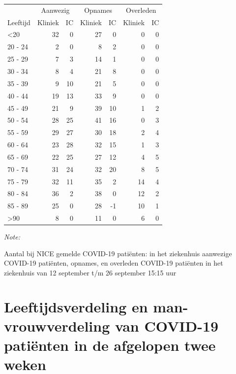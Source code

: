 \documentclass[
  english,
  man,floatsintext]{apa6}
\begin{document}
\begin{table}
\centering\begingroup\fontsize{10}{12}\selectfont

\begin{threeparttable}
\begin{tabular}{lrrrrrr}
\toprule
\multicolumn{1}{c}{ } & \multicolumn{2}{c}{Aanwezig} & \multicolumn{2}{c}{Opnames} & \multicolumn{2}{c}{Overleden} \\
\cmidrule(l{3pt}r{3pt}){2-3} \cmidrule(l{3pt}r{3pt}){4-5} \cmidrule(l{3pt}r{3pt}){6-7}
Leeftijd & Kliniek & IC & Kliniek & IC & Kliniek & IC\\
\midrule
<20 & 32 & 0 & 27 & 0 & 0 & 0\\
20 - 24 & 2 & 0 & 8 & 2 & 0 & 0\\
25 - 29 & 7 & 3 & 14 & 1 & 0 & 0\\
30 - 34 & 8 & 4 & 21 & 8 & 0 & 0\\
35 - 39 & 9 & 10 & 21 & 5 & 0 & 0\\
40 - 44 & 19 & 13 & 33 & 9 & 0 & 0\\
45 - 49 & 21 & 9 & 39 & 10 & 1 & 2\\
50 - 54 & 28 & 25 & 41 & 16 & 0 & 3\\
55 - 59 & 29 & 27 & 30 & 18 & 2 & 4\\
60 - 64 & 23 & 28 & 32 & 15 & 1 & 3\\
65 - 69 & 22 & 25 & 27 & 12 & 4 & 5\\
70 - 74 & 31 & 24 & 32 & 20 & 8 & 5\\
75 - 79 & 32 & 11 & 35 & 2 & 14 & 4\\
80 - 84 & 36 & 2 & 38 & 0 & 12 & 2\\
85 - 89 & 25 & 0 & 28 & -1 & 10 & 1\\
>90 & 8 & 0 & 11 & 0 & 6 & 0\\
\bottomrule
\end{tabular}
\begin{tablenotes}
\item \textit{Note: } 
\item Aantal bij NICE gemelde COVID-19 patiënten: in het ziekenhuis aanwezige COVID-19 patiënten, opnames, en overleden COVID-19 patiënten in het ziekenhuis van 12 september t/m 26 september 15:15 uur
\end{tablenotes}
\end{threeparttable}
\endgroup{}
\end{table}

\newpage

\hypertarget{leeftijdsverdeling-en-man-vrouwverdeling-van-covid-19-patiuxebnten-in-de-afgelopen-twee-weken}{%
\section{Leeftijdsverdeling en man-vrouwverdeling van COVID-19 patiënten in de afgelopen twee weken}\label{leeftijdsverdeling-en-man-vrouwverdeling-van-covid-19-patiuxebnten-in-de-afgelopen-twee-weken}}
\end{document}
